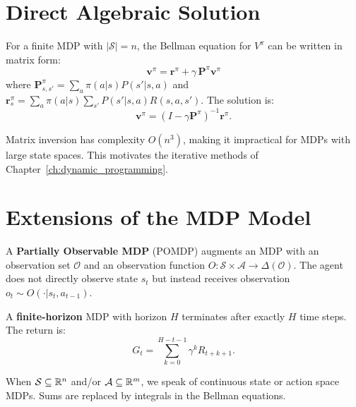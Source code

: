\section{Direct Algebraic Solution}

\begin{proposition}
For a finite MDP with $|\mathcal{S}| = n$, the Bellman equation for $V^\pi$
can be written in matrix form:
\[
    \mathbf{v}^\pi = \mathbf{r}^\pi + \gamma \, \mathbf{P}^\pi \mathbf{v}^\pi
\]
where $\mathbf{P}^\pi_{s,s'} = \sum_a \pi(a|s) P(s'|s,a)$ and
$\mathbf{r}^\pi_s = \sum_a \pi(a|s) \sum_{s'} P(s'|s,a) R(s,a,s')$.
The solution is:
\[
    \mathbf{v}^\pi = (I - \gamma \mathbf{P}^\pi)^{-1} \mathbf{r}^\pi.
\]
\end{proposition}

\begin{warning}[title=\textbf{Complexity of Direct Solution}]
Matrix inversion has complexity $O(n^3)$, making it impractical for MDPs with
large state spaces. This motivates the iterative methods of
Chapter~\ref{ch:dynamic_programming}.
\end{warning}

\section{Extensions of the MDP Model}

\begin{definition}[POMDP]
A \textbf{Partially Observable MDP} (POMDP) augments an MDP with an observation
set $\mathcal{O}$ and an observation function $O : \mathcal{S} \times \mathcal{A} \to \Delta(\mathcal{O})$.
The agent does not directly observe state $s_t$ but instead receives observation
$o_t \sim O(\cdot | s_t, a_{t-1})$.
\end{definition}

\begin{definition}
A \textbf{finite-horizon} MDP with horizon $H$ terminates after exactly $H$
time steps. The return is:
\[
    G_t = \sum_{k=0}^{H-t-1} \gamma^k R_{t+k+1}.
\]
\end{definition}

\begin{definition}
When $\mathcal{S} \subseteq \mathbb{R}^n$ and/or $\mathcal{A} \subseteq \mathbb{R}^m$, we speak
of continuous state or action space MDPs. Sums are replaced by integrals in the
Bellman equations.
\end{definition}

